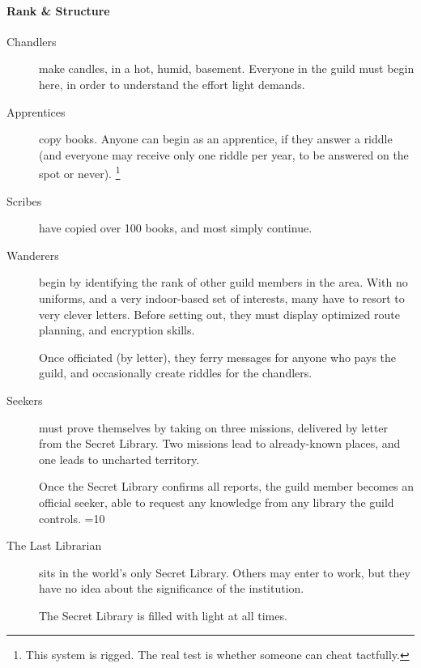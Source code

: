 \begin{multicols}{2}
\paragraph{Rank \& Structure}

\begin{description}
  \item[Chandlers]
  make candles, in a hot, humid, basement.
  Everyone in the guild must begin here, in order to understand the effort light demands.
  \item[Apprentices]
  copy books.
  Anyone can begin as an apprentice, if they answer a riddle (and everyone may receive only one riddle per year, to be answered on the spot or never).%
  \footnote{This system is rigged. The real test is whether someone can cheat tactfully.}
  \item[Scribes]
  have copied over 100 books, and most simply continue.
  \item[Wanderers]
  begin by identifying the rank of other guild members in the area.
  With no uniforms, and a very indoor-based set of interests, many have to resort to very clever letters.
  Before setting out, they must display optimized route planning, and encryption skills.

  Once officiated (by letter), they ferry messages for anyone who pays the guild, and occasionally create riddles for the chandlers.
  \item[Seekers]
  must prove themselves by taking on three missions, delivered by letter from the Secret Library.
  Two missions lead to already-known places, and one leads to uncharted territory.

  Once the Secret Library confirms all reports, the guild member becomes an official seeker, able to request any knowledge from any library the guild controls.
  \ifnum\value{season}=10
  \item[The Last Librarian]
  sits in the world's only Secret Library.
  Others may enter to work, but they have no idea about the significance of the institution.

  The Secret Library is filled with light at all times.
  \fi
\end{description}

\end{multicols}
